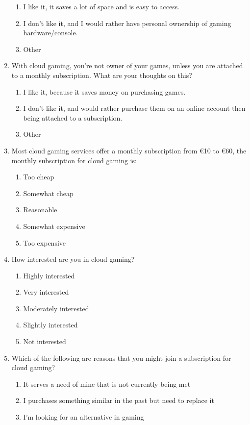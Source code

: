 \begin{enumerate}
	\begin{enumerate}
		\item I like it, it saves a lot of space and is easy to access.
		\item I don't like it, and I would rather have personal ownership of gaming hardware/console.
		\item Other
	\end{enumerate}
	\item With cloud gaming, you're not owner of your games, unless you are attached to a monthly subscription. What are your thoughts on this?
	\begin{enumerate}
		\item I like it, because it saves money on purchasing games.
		\item I don't like it, and would rather purchase them on an online account then being attached to a subscription.
		\item Other
	\end{enumerate}
	\item Most cloud gaming services offer a monthly subscription from €10 to €60, the monthly subscription for cloud gaming is:
	\begin{enumerate}
		\item Too cheap
		\item Somewhat cheap
		\item Reasonable
		\item Somewhat expensive
		\item Too expensive
	\end{enumerate}
	\item How interested are you in cloud gaming?
	\begin{enumerate}
		\item Highly interested
		\item Very interested
		\item Moderately interested
		\item Slightly interested
		\item Not interested
	\end{enumerate}
	\item Which of the following are reasons that you might join a subscription for cloud gaming?
	\begin{enumerate}
		\item It serves a need of mine that is not currently being met
		\item I purchases something similar in the past but need to replace it
		\item I'm looking for an alternative in gaming

\end{enumerate}
\end{enumerate}
